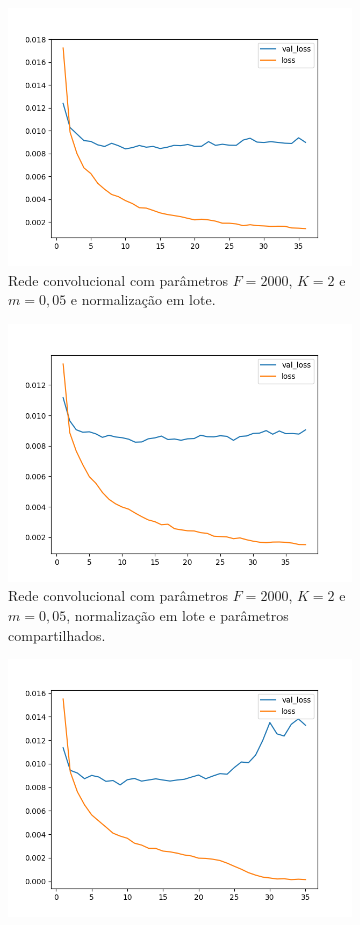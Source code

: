 \begin{figure}[H]
\begin{subfigure}{.5\textwidth}
  \includegraphics[width=.8\linewidth]{figuras/ape-ajustes-hiper-parametros/cnn-with-bn-2000-k-2-m-005.png}
  \caption{Rede convolucional com parâmetros $F = 2000$, $K = 2$ e $m = 0,05$ e normalização em lote.}
  \label{fig:cnn-2000-k-2-m-005-normalizacao-em-lote-v2}
\end{subfigure}
\begin{subfigure}{.5\textwidth}
  \centering
  \includegraphics[width=.8\linewidth]{figuras/ape-ajustes-hiper-parametros/shared-cnn-with-bn-2000-k-2-m-005.png}
  \caption{Rede convolucional com parâmetros $F = 2000$, $K = 2$ e $m = 0,05$, normalização em lote e parâmetros compartilhados.}
  \label{fig:shared-cnn-2000-k-2-m-005-normalizacao-em-lote}
\end{subfigure}
\begin{subfigure}{.5\textwidth}
  \centering
  \includegraphics[width=.8\linewidth]{figuras/ape-ajustes-hiper-parametros/cnn-with-bn-4000-k-2-m-005.png}

\end{subfigure}
\end{figure}

